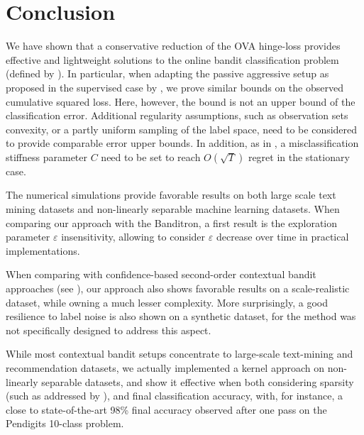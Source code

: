 \documentclass[preprint,12pt,authoryear]{elsarticle}
\begin{document}
\section{Conclusion}
\label{sec:conclusion}

We have shown that a conservative reduction of the OVA hinge-loss  provides effective and lightweight solutions to the online bandit classification problem (defined by \cite{kakade2008efficient}). 
In particular, when adapting the passive aggressive setup as proposed in the supervised case by \cite{crammer2006online}, 
we prove  similar bounds on the observed cumulative squared loss. 
Here, however, the bound is not an upper bound of the classification error. Additional regularity assumptions, such as observation sets convexity, or a partly uniform sampling of the label space, need to be considered to provide comparable error upper bounds. In addition, as in \cite{crammer2006online}, a misclassification stiffness parameter $C$ need to be set to reach $O(\sqrt{T})$ regret in the stationary case.  

The numerical simulations provide favorable results on both large scale text mining  datasets and non-linearly separable machine learning datasets. 
When comparing our approach with the Banditron, a first result is the exploration parameter $\varepsilon$ insensitivity, allowing to consider $\varepsilon$ decrease  over time in practical implementations.
 
When comparing with confidence-based second-order contextual bandit approaches (see \cite{crammer2013multiclass}), our approach also shows favorable results on a scale-realistic dataset, while owning a much lesser complexity. More surprisingly, a good resilience to label noise is also shown on a synthetic dataset, for the method was not specifically designed to address this aspect. 

While most contextual bandit setups concentrate to large-scale text-mining and recommendation datasets, we actually implemented a kernel approach on non-linearly separable datasets, and show it effective when both considering sparsity (such as addressed by \cite{kivinen2004online}), and final classification accuracy, with, for instance, a close to state-of-the-art 98\% final accuracy observed after one pass on the Pendigits 10-class problem.
\end{document}
